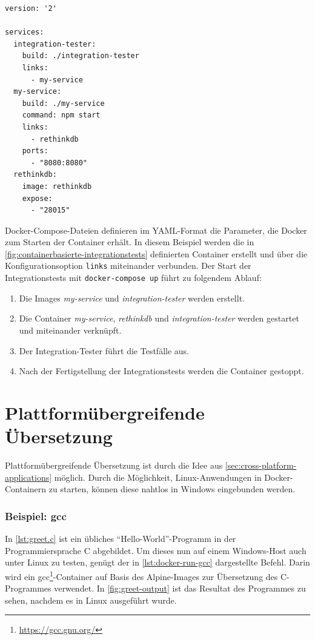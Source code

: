 \begin{lstlisting}[caption=Servicedefinition zum Integrationstesten (docker-compose-yml), label=lst:docker-compose-integrationstests]
version: '2'

services:
  integration-tester:
    build: ./integration-tester
    links:
      - my-service
  my-service:
    build: ./my-service
    command: npm start
    links:
      - rethinkdb
    ports:
      - "8080:8080"
  rethinkdb:
    image: rethinkdb
    expose:
      - "28015"
\end{lstlisting}
Docker-Compose-Dateien definieren im YAML-Format die Parameter, die Docker zum Starten der Container erhält.
In diesem Beispiel werden die in \cref{fig:containerbasierte-integrationstests} definierten Container erstellt und über die Konfigurationsoption \texttt{links} miteinander verbunden.
Der Start der Integrationstests mit \texttt{docker-compose up} führt zu folgendem Ablauf:
\begin{enumerate}
    \item Die Images \emph{my-service} und \emph{integration-tester} werden erstellt.
    \item Die Container \emph{my-service}, \emph{rethinkdb} und \emph{integration-tester} werden gestartet und miteinander verknüpft.
    \item Der Integration-Tester führt die Testfälle aus.
    \item Nach der Fertigstellung der Integrationstests werden die Container gestoppt.
\end{enumerate}

\section{Plattformübergreifende Übersetzung}
\label{sec:plattformuebergreifende-uebersetzung}
Plattformübergreifende Übersetzung ist durch die Idee aus \cref{sec:cross-platform-applications} möglich.
Durch die Möglichkeit, Linux-Anwendungen in Docker-Containern zu starten, können diese nahtlos in Windows eingebunden werden.

\subsubsection{Beispiel: gcc}
In \cref{lst:greet.c} ist ein übliches "`Hello-World"'-Programm in der Programmiersprache C abgebildet.
Um dieses nun auf einem Windows-Host auch unter Linux zu testen, genügt der in \cref{lst:docker-run-gcc} dargestellte Befehl.
Darin wird ein gcc\footnote{\url{https://gcc.gnu.org/}}-Container auf Basis des Alpine-Images zur Übersetzung des C-Programmes verwendet.
In \cref{fig:greet-output} ist das Resultat des Programmes zu sehen, nachdem es in Linux ausgeführt wurde.

